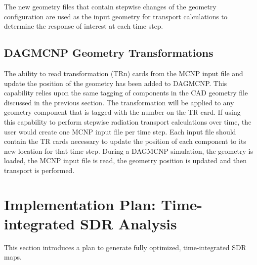 The new geometry files that contain stepwise changes of the geometry 
configuration are used as the input geometry for
transport calculations to determine the response of interest at each time step.


\subsection{DAGMCNP Geometry Transformations}\label{sec:mcnp_tr}
The ability to read transformation (TRn) cards from the MCNP input file and 
update the position of the geometry has been added to DAGMCNP.  This
 capability relies upon the same tagging of components in the CAD geometry 
file discussed in the previous section.  The transformation will be applied to any 
geometry component that is tagged with the number on the TR card.  If using 
this capability to perform stepwise radiation transport calculations over time, 
the user would create one MCNP input file per time step.  Each input file 
should contain the TR cards necessary to update the position of each component 
to its new location for that time step.  During a DAGMCNP simulation, the 
geometry is loaded, the MCNP input file is read, the geometry position is 
updated and then transport is performed.

\section{Implementation Plan: Time-integrated SDR Analysis}\label{sec:implementation}

This section introduces a plan to generate fully optimized, time-integrated
SDR maps.


